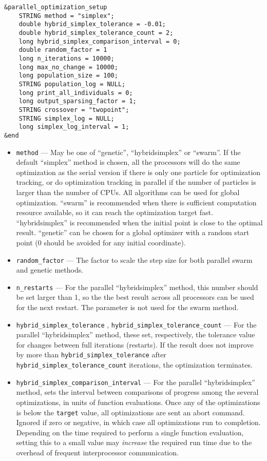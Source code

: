 \documentclass[11pt]{article}
\begin{document}
\begin{verbatim}
&parallel_optimization_setup
    STRING method = "simplex";
    double hybrid_simplex_tolerance = -0.01;
    double hybrid_simplex_tolerance_count = 2;
    long hybrid_simplex_comparison_interval = 0;
    double random_factor = 1
    long n_iterations = 10000;
    long max_no_change = 10000;
    long population_size = 100;
    STRING population_log = NULL;
    long print_all_individuals = 0;
    long output_sparsing_factor = 1;
    STRING crossover = "twopoint";
    STRING simplex_log = NULL;
    long simplex_log_interval = 1;
&end
\end{verbatim}

\begin{itemize}
\item \verb|method| --- May be one of ``genetic'', ``hybridsimplex'' or ``swarm''. If the default ``simplex'' method is chosen, all the processors will do the same optimization as the serial version if there is only one particle for optimization tracking, or do optimization tracking in parallel if the number of particles is larger than the number of CPUs. All algorithms can be used for global optimization. ``swarm'' is recommended when there is sufficient computation resource available, so it can reach the optimization target fast. ``hybridsimplex'' is recommended when the initial point is close to the optimal result. ``genetic'' can be chosen for a global optimizer with a random start point (0 should be avoided for any initial coordinate). 

\item \verb|random_factor| --- The factor to scale the step size for both parallel swarm and genetic methods.

\item \verb|n_restarts| --- For the parallel ``hybridsimplex'' method, this number should be set larger than 1, so the the best result across all processors can be used for the next restart. The parameter is not used for the swarm method.

\item \verb|hybrid_simplex_tolerance| , \verb|hybrid_simplex_tolerance_count| --- For the parallel ``hybridsimplex'' method,
  these set, respectively, the tolerance value for changes between full iterations (restarts). If the result does not improve by
  more than \verb|hybrid_simplex_tolerance| after \verb|hybrid_simplex_tolerance_count| iterations, the optimization terminates.

\item \verb|hybrid_simplex_comparison_interval| --- For the parallel ``hybridsimplex'' method, sets the interval between
  comparisons of progress among the several optimizations, in units of function evaluations. Once any of the optimizations
  is below the \verb|target| value, all optimizations are sent an abort command.
  Ignored if zero or negative, in which case all optimizations run to completion.
  Depending on the time required to perform a single function evaluation, setting this to a small value 
  may {\em increase} the required run time due to the overhead of frequent interprocessor communication.


\end{itemize}
\end{document}
